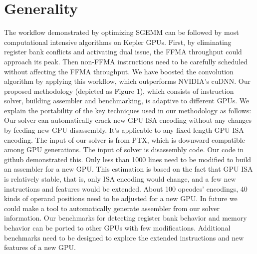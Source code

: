 \section{Generality}
\label{sec:generality}
The workflow demonstrated by optimizing SGEMM can be followed by most computational intensive algorithms on Kepler GPUs. First, by eliminating register bank conflicts and activating dual issue, the FFMA throughput could approach its peak. Then non-FFMA instructions need to be carefully scheduled without affecting the FFMA throughput. We have boosted the convolution algorithm by applying this workflow, which outperforms NVIDIA's cuDNN. 
Our proposed methodology (depicted as Figure 1), which consists of instruction solver, building assembler and benchmarking, is adaptive to different GPUs. We explain the portability of the key techniques used in our methodology as follows:
Our solver can automatically crack new GPU ISA encoding without any changes by feeding new GPU disassembly. It's applicable to any fixed length GPU ISA encoding. The input of our solver is from PTX, which is downward compatible among GPU generations. The input of solver is disassembly code. Our code in github demonstrated this.
Only less than 1000 lines need to be modified to build an assembler for a new GPU. This estimation is based on the fact that GPU ISA is relatively stable, that is, only ISA encoding would change, and a few new instructions and features would be extended. About 100 opcodes' encodings, 40 kinds of operand positions need to be adjusted for a new GPU. In future we could make a tool to automatically generate  assembler from our solver information.
Our benchmarks for detecting register bank behavior and memory behavior can be ported to other GPUs with few modifications. Additional benchmarks need to be designed to explore the extended instructions and new features of a new GPU.
